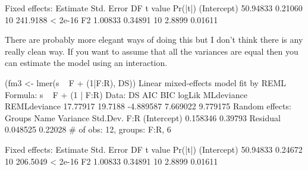 Fixed effects:
            Estimate Std. Error DF  t value Pr(|t|)
(Intercept) 50.94833    0.21060 10 241.9188  < 2e-16
F2           1.00833    0.34891 10   2.8899  0.01611

There are probably more elegant ways of doing this but I don't think
there is any really clean way.  If you want to assume that all the
variances are equal then you can estimate the model using an
interaction.

 (fm3 <- lmer(s ~ F + (1|F:R), DS))
Linear mixed-effects model fit by REML
Formula: s ~ F + (1 | F:R)
   Data: DS
      AIC     BIC    logLik MLdeviance REMLdeviance
 17.77917 19.7188 -4.889587   7.669022     9.779175
Random effects:
 Groups   Name        Variance Std.Dev.
 F:R      (Intercept) 0.158346 0.39793
 Residual             0.048525 0.22028
# of obs: 12, groups: F:R, 6

Fixed effects:
            Estimate Std. Error DF  t value Pr(|t|)
(Intercept) 50.94833    0.24672 10 206.5049  < 2e-16
F2           1.00833    0.34891 10   2.8899  0.01611


